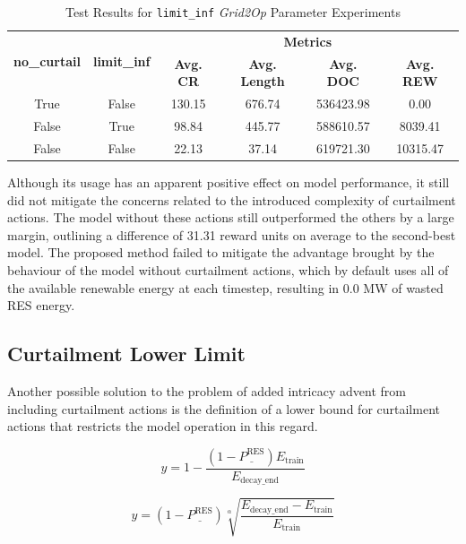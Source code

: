 \begin{table}[h!]
	\centering
	\caption{Test Results for \texttt{limit\_inf} \textit{Grid2Op} Parameter Experiments}
	\begin{tabular}{cccccc}
		\toprule
		\multirow{2}{*}{\textbf{no\_curtail}} & \multirow{2}{*}{\textbf{limit\_inf}} & \multicolumn{4}{c}{\textbf{Metrics}} \\ 
		\cmidrule(lr){3-6}
		&  & \textbf{Avg. CR} & \textbf{Avg. Length} & \textbf{Avg. DOC} & \textbf{Avg. REW} \\ 
		\midrule
		True & False & 130.15 & 676.74 & 536423.98 & 0.00 \\
		False & True  & 98.84 & 445.77 & 588610.57 & 8039.41 \\
		False & False & 22.13 & 37.14 & 619721.30 & 10315.47 \\
		
		\bottomrule
	\end{tabular}
	\label{tab:test-gcn-limit}
\end{table}

Although its usage has an apparent positive effect on model performance, it still did not mitigate the concerns related to the introduced complexity of curtailment actions. The model without these actions still outperformed the others by a large margin, outlining a difference of 31.31 reward units on average to the second-best model. The proposed method failed to mitigate the advantage brought by the behaviour of the model without curtailment actions, which by default uses all of the available renewable energy at each timestep, resulting in 0.0 MW of wasted \ac{RES} energy.

\subsection{Curtailment Lower Limit} \label{sec:results-lower}

Another possible solution to the problem of added intricacy advent from including curtailment actions is the definition of a lower bound for curtailment actions that restricts the model operation in this regard. \par

\begin{equation} \label{eq:linear-decay}
	y = 1 - \frac{(1 - \underline{P^\text{RES}}) E_\text{train}}{E_\text{decay\_end}}
\end{equation}

\begin{equation} \label{eq:sqrt-decay}
	y = (1 - \underline{P^\text{RES}}) \sqrt[\alpha]{\frac{E_\text{decay\_end} - E_\text{train}}{E_\text{train}}}
\end{equation}

